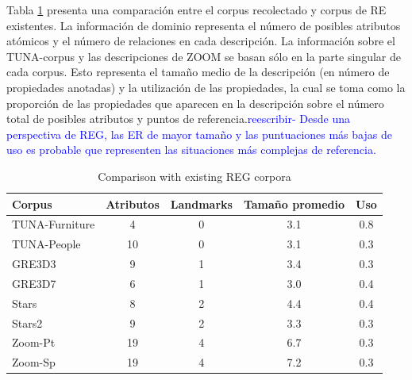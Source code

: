 Tabla \ref{tab-comparison} presenta una comparaci\'on entre el corpus recolectado y corpus de RE existentes. La informaci\'on de dominio representa el n\'umero de posibles atributos at\'omicos y el n\'umero de relaciones en cada descripci\'on. La informaci\'on sobre el TUNA-corpus y las descripciones de ZOOM se basan s\'olo en la parte singular de cada corpus. Esto representa el tama\~no medio de la descripci\'on (en n\'umero de propiedades anotadas) y la utilizaci\'on de las propiedades, la cual se toma como la proporci\'on de las propiedades que aparecen en la descripci\'on sobre el n\'umero total de posibles atributos y puntos de referencia.\textcolor{blue}{reescribir- Desde una perspectiva de REG, las ER de mayor tama\~no y las puntuaciones m\'as bajas de uso es probable que representen las situaciones m\'as complejas de referencia.}


\begin{table}[ht]
\begin{center}
\footnotesize{
\caption{Comparison with existing REG corpora}
\label{tab-comparison}
\begin{tabular} {  l c c c c}
\hline
Corpus											& Atributos			& Landmarks			& Tama\~{n}o promedio	& Uso \\
\hline
TUNA-Furniture							& 4								& 0							& 3.1				& 0.8   \\
TUNA-People									& 10							& 0							& 3.1				& 0.3   \\
GRE3D3											& 9								& 1							& 3.4				& 0.3   \\
GRE3D7											& 6								& 1							& 3.0				& 0.4   \\
Stars												& 8								& 2							& 4.4				& 0.4   \\
Stars2											& 9								& 2							& 3.3				& 0.3   \\
Zoom-Pt											& 19							& 4							& 6.7				& 0.3   \\
Zoom-Sp											& 19							& 4							& 7.2				& 0.3   \\
\hline
\end{tabular}
}
\end{center}
\end{table}



